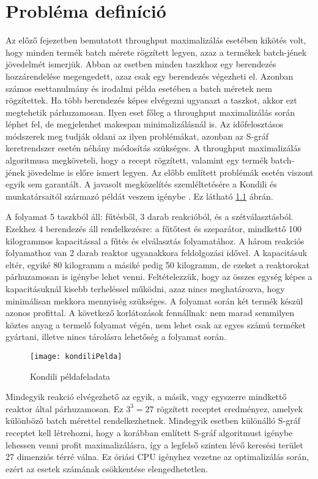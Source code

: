 \chapter{Probléma definíció}
Az előző fejezetben bemutatott throughput maximalizálás esetében kikötés volt, hogy minden termék batch mérete rögzített legyen, azaz a termékek batch-jének jövedelmét ismerjük.
Abban az esetben minden taszkhoz egy berendezés hozzárendelése megengedett, azaz csak egy berendezés végezheti el.
Azonban számos esettanulmány és irodalmi példa esetében a batch méretek nem rögzítettek.
Ha több berendezés képes elvégezni ugyanazt a taszkot, akkor ezt megtehetik párhuzamosan.
Ilyen eset főleg a throughput maximalizálás során léphet fel, de megjelenhet makespan minimalizálásnál is.
Az időfelosztásos módszerek meg tudják oldani az ilyen problémákat, azonban az S-gráf keretrendszer esetén néhány módosítás szükséges.
A throughput maximalizálás algoritmusa megköveteli, hogy a recept rögzített, valamint egy termék batch-jének jövedelme is előre ismert legyen.
Az előbb említett problémák esetén viszont egyik sem garantált. 
A javasolt megközelítés szemléltetésére a Kondili és munkatársaitól származó példát veszem igénybe \cite{kondili}.
Ez látható \ref{kondiliPelda} ábrán.

A folyamat 5 taszkból áll: fűtésből, 3 darab reakcióból, és a szétválasztásból.
Ezekhez 4 berendezés áll rendelkezésre: a fűtőtest és szeparátor, mindkettő 100 kilogrammos kapacitással a fűtés és elválasztás folyamatához.
A három reakciós folyamathoz van 2 darab reaktor ugyanakkora feldolgozási idővel.
A kapacitásuk eltér, egyiké 80 kilogramm a másiké pedig 50 kilogramm, de ezeket a reaktorokat párhuzamosan is igénybe lehet venni.
Feltételezzük, hogy az összes egység képes a kapacitásuknál kisebb terheléssel működni, azaz nincs meghatározva, hogy minimálisan mekkora mennyiség szükséges.
A folyamat során két termék készül azonos profittal.
A következő korlátozások fennállnak: nem marad semmilyen köztes anyag a termelő folyamat végén, nem lehet csak az egyes számú terméket gyártani, illetve nincs tárolásra lehetőség a folyamat során.
\begin{figure}[H]
\begin{center}
\texttt{[image: kondiliPelda]}
\caption{Kondili példafeladata}
\label{kondiliPelda}
\end{center}
\end{figure}

Mindegyik reakció elvégezhető az egyik, a másik, vagy egyszerre mindkettő reaktor által párhuzamosan.
Ez $3^3 = 27$ rögzített receptet eredményez, amelyek különböző batch mérettel rendelkezhetnek.
Mindegyik esetben különálló S-gráf receptet kell létrehozni, hogy a korábban említett S-gráf algoritmust igénybe lehessen venni profit maximalizálásra, így a legfelső szinten lévő keresési terület 27 dimenziós térré válna.
Ez óriási CPU igényhez vezetne az optimalizálás során, ezért az esetek számának csökkentése elengedhetetlen.

